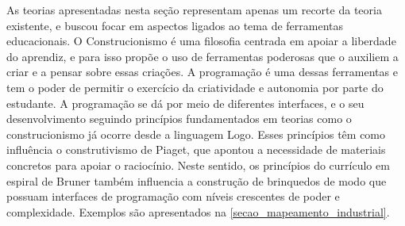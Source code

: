 As teorias apresentadas nesta seção representam apenas um recorte da teoria existente, e buscou focar em aspectos ligados ao tema de ferramentas educacionais. O Construcionismo é uma filosofia centrada em apoiar a liberdade do aprendiz, e para isso propõe o uso de ferramentas poderosas que o auxiliem a criar e a pensar sobre essas criações. A programação é uma dessas ferramentas e tem o poder de permitir o exercício da criatividade e autonomia por parte do estudante. A programação se dá por meio de diferentes interfaces, e o seu desenvolvimento seguindo princípios fundamentados em teorias como o construcionismo já ocorre desde a linguagem Logo. Esses princípios têm como influência o construtivismo de Piaget, que apontou a necessidade de materiais concretos para apoiar o raciocínio. Neste sentido, os princípios do currículo em espiral de Bruner também influencia a construção de brinquedos de modo que possuam interfaces de programação com níveis crescentes de poder e complexidade. Exemplos são apresentados na \autoref{secao_mapeamento_industrial}.



